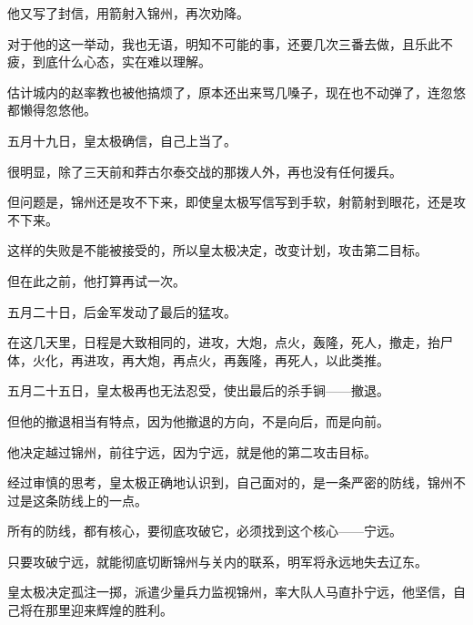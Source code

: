 \begin{multicols}{\theparacolNo}
		他又写了封信，用箭射入锦州，再次劝降。

		对于他的这一举动，我也无语，明知不可能的事，还要几次三番去做，且乐此不疲，到底什么心态，实在难以理解。

		估计城内的赵率教也被他搞烦了，原本还出来骂几嗓子，现在也不动弹了，连忽悠都懒得忽悠他。

		五月十九日，皇太极确信，自己上当了。

		很明显，除了三天前和莽古尔泰交战的那拨人外，再也没有任何援兵。

		但问题是，锦州还是攻不下来，即使皇太极写信写到手软，射箭射到眼花，还是攻不下来。

		这样的失败是不能被接受的，所以皇太极决定，改变计划，攻击第二目标。

		但在此之前，他打算再试一次。

		五月二十日，后金军发动了最后的猛攻。

		在这几天里，日程是大致相同的，进攻，大炮，点火，轰隆，死人，撤走，抬尸体，火化，再进攻，再大炮，再点火，再轰隆，再死人，以此类推。

		五月二十五日，皇太极再也无法忍受，使出最后的杀手锏——撤退。

		但他的撤退相当有特点，因为他撤退的方向，不是向后，而是向前。

		他决定越过锦州，前往宁远，因为宁远，就是他的第二攻击目标。

		经过审慎的思考，皇太极正确地认识到，自己面对的，是一条严密的防线，锦州不过是这条防线上的一点。

		所有的防线，都有核心，要彻底攻破它，必须找到这个核心——宁远。

		只要攻破宁远，就能彻底切断锦州与关内的联系，明军将永远地失去辽东。

		皇太极决定孤注一掷，派遣少量兵力监视锦州，率大队人马直扑宁远，他坚信，自己将在那里迎来辉煌的胜利。
		\ifnum{}
	\end{multicols}
\fi
\newpage
